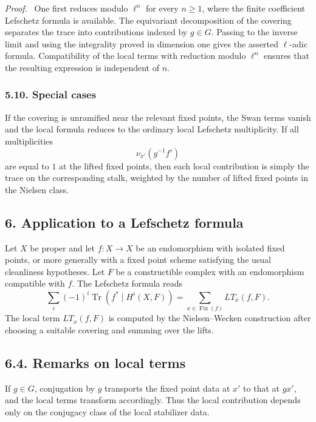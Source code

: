 \documentclass[14pt]{extarticle}
\newenvironment{prooftext}[1][Proof]{\par\noindent\emph{#1.}\ }{\par\medskip}
\begin{document}
\begin{prooftext}
One first reduces modulo $\ell^n$ for every $n\ge1$, where the finite coefficient Lefschetz formula is available. The equivariant decomposition of the covering separates the trace into contributions indexed by $g\in G$. Passing to the inverse limit and using the integrality proved in dimension one gives the asserted $\ell$-adic formula. Compatibility of the local terms with reduction modulo $\ell^n$ ensures that the resulting expression is independent of $n$.
\end{prooftext}

\subsubsection*{5.10. Special cases}

If the covering is unramified near the relevant fixed points, the Swan terms vanish and the local formula reduces to the ordinary local Lefschetz multiplicity. If all multiplicities
\[
   \nu_{x'}(g^{-1}f')
\]
are equal to $1$ at the lifted fixed points, then each local contribution is simply the trace on the corresponding stalk, weighted by the number of lifted fixed points in the Nielsen class.

\subsection*{6. Application to a Lefschetz formula}

Let $X$ be proper and let $f:X\to X$ be an endomorphism with isolated fixed points, or more generally with a fixed point scheme satisfying the usual cleanliness hypotheses. Let $F$ be a constructible complex with an endomorphism compatible with $f$. The Lefschetz formula reads
\[
   \sum_i(-1)^i\operatorname{Tr}(f^*\mid H^i(X,F))
      =\sum_{x\in \operatorname{Fix}(f)}LT_x(f,F).
\]
The local term $LT_x(f,F)$ is computed by the Nielsen--Wecken construction after choosing a suitable covering and summing over the lifts.

\subsection*{6.4. Remarks on local terms}

If $g\in G$, conjugation by $g$ transports the fixed point data at $x'$ to that at $gx'$, and the local terms transform accordingly. Thus the local contribution depends only on the conjugacy class of the local stabilizer data.
\end{document}
